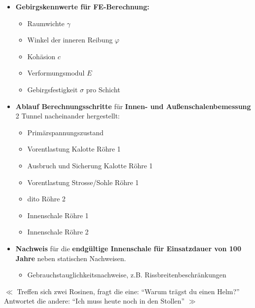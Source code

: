 \documentclass[fleqn,twoside]{article}
\begin{document}
\begin{small}
\begin{itemize}
    \item \textbf{Gebirgskennwerte für FE-Berechnung:}
        \begin{itemize}
            \item Raumwichte $\gamma$
            \item Winkel der inneren Reibung $\varphi$
            \item Kohäsion $c$
            \item Verformungsmodul $E$
            \item Gebirgsfestigkeit $\sigma$ pro Schicht
        \end{itemize}
    \item \textbf{Ablauf Berechnungsschritte} für \textbf{Innen- und Außenschalenbemessung} 2 Tunnel nacheinander hergestellt:
        \begin{itemize}
            \item Primärspannungszustand
            \item Vorentlastung Kalotte Röhre 1
            \item Ausbruch und Sicherung Kalotte Röhre 1
            \item Vorentlastung Strosse/Sohle Röhre 1
            \item dito Röhre 2
            \item Innenschale Röhre 1
            \item Innenschale Röhre 2
        \end{itemize}
    \item \textbf{Nachweis} für die \textbf{endgültige Innenschale für Einsatzdauer von 100 Jahre} neben statischen Nachweisen.
        \begin{itemize}
            \item Gebrauchstauglichkeitsnachweise, z.B. Rissbreitenbeschränkungen
        \end{itemize}
    
\end{itemize}
\end{small}

\begin{center} \vspace*{\fill} \begin{tiny} $\ll$ 
Treffen sich zwei Rosinen, fragt die eine: \enquote{Warum trägst du einen Helm?} Antwortet die andere: \enquote{Ich muss heute noch in den Stollen} 
$\gg$ \end{tiny} \end{center}
\end{document}
